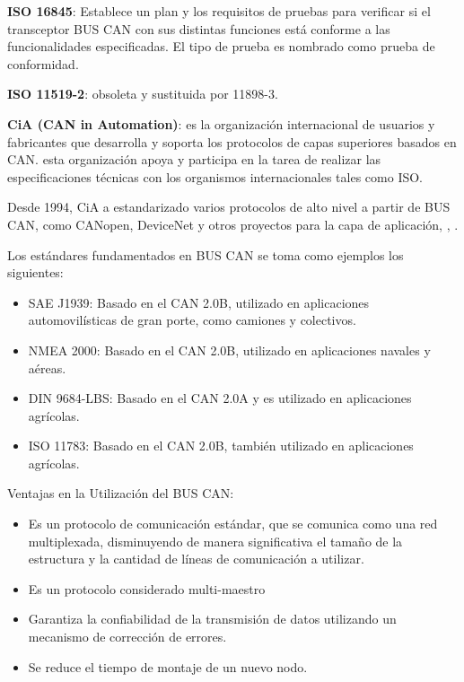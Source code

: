 \textbf{ISO 16845}: Establece un plan  y los requisitos de pruebas para verificar si el transceptor BUS CAN con sus distintas funciones está conforme  a las funcionalidades especificadas. El tipo de prueba es nombrado como prueba de conformidad. 

\textbf{ISO 11519-2}: obsoleta y sustituida por 11898-3. 

\textbf{CiA (CAN in Automation)}:  es la organización internacional de usuarios y fabricantes que desarrolla y soporta los protocolos de capas superiores basados en CAN.
esta organización apoya y participa en la tarea de realizar las especificaciones técnicas con los organismos internacionales tales como ISO. 

Desde 1994, CiA a estandarizado varios protocolos de alto nivel a partir de BUS CAN, como CANopen, DeviceNet y otros proyectos para la capa de aplicación, \cite{NI}, \cite{CIA}.




Los estándares fundamentados en BUS CAN se toma como ejemplos los siguientes:

\begin {itemize}
\item SAE J1939: Basado en el CAN 2.0B, utilizado en aplicaciones automovilísticas de gran porte, como camiones y colectivos.
\item NMEA 2000: Basado en el CAN 2.0B, utilizado en aplicaciones navales y aéreas.
\item DIN 9684-LBS: Basado en el CAN 2.0A y es utilizado en aplicaciones agrícolas.
\item ISO 11783: Basado en el CAN 2.0B, también utilizado en aplicaciones agrícolas.
\end{itemize}

Ventajas en la Utilización del  BUS CAN:

\begin {itemize}
\item Es un protocolo de comunicación estándar, que se comunica como una red multiplexada, disminuyendo de manera significativa el tamaño de la estructura y la cantidad de líneas de comunicación a utilizar.
\item Es un protocolo considerado multi-maestro
\item Garantiza la confiabilidad de la transmisión de datos utilizando un mecanismo de corrección de errores.
\item Se reduce el tiempo de montaje de un nuevo nodo.
\end {itemize}









